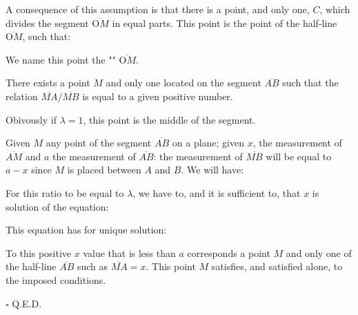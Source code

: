 	A consequence of this assumption is that there is a point, and only one, $C$, which divides the segment $\overline{\text{O}M}$ in equal parts. This point is the point of the half-line $\overline{\text{O}M}$, such that:
	
	We name this point the "" $\overline{\text{O}M}$.
	\begin{theorem}
	There exists a point $M$ and only one located on the segment $\overline{AB}$ such that the relation $\overline{MA}/\overline{MB}$ is equal to a given positive number.
	\end{theorem}
	\begin{tcolorbox}[title=Remark,colframe=black,arc=10pt]
	Obivously if $\lambda=1$, this point is the middle of the segment.
	\end{tcolorbox}
	\begin{dem}
	Given $M$ any point of the segment $\overline{AB}$ on a plane; given $x$, the measurement of $\overline{AM}$ and $a$  the measurement of $\overline{AB}$: the measurement of $\overline{MB}$ will be equal to $a-x$ since $M$ is placed between $A$ and $B$. We will have:
	
	For this ratio to be equal to $\lambda$, we have to, and it is sufficient to, that $x$ is solution of the equation:
	
	This equation has for unique solution:
	
	To this positive $x$ value that is less than $a$ corresponds a point $M$ and only one of the half-line $\overline{AB}$ such as $\overline{MA} = x$. This point $M$ satisfies, and satisfied alone, to the imposed conditions.
	\begin{flushright}
		$\square$  Q.E.D.
	\end{flushright}
	\end{dem}
	
